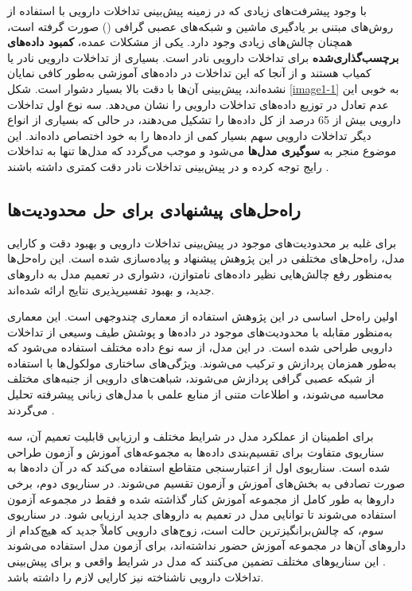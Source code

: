 با وجود پیشرفت‌های زیادی که در زمینه پیش‌بینی تداخلات دارویی با استفاده از روش‌های مبتنی بر یادگیری ماشین و شبکه‌های عصبی گرافی () صورت گرفته است، همچنان چالش‌های زیادی وجود دارد. یکی از مشکلات عمده، \textbf{کمبود داده‌های برچسب‌گذاری‌شده} برای تداخلات دارویی نادر است. بسیاری از تداخلات دارویی نادر یا کمیاب هستند و از آنجا که این تداخلات در داده‌های آموزشی به‌طور کافی نمایان نشده‌اند، پیش‌بینی آن‌ها با دقت بالا بسیار دشوار است. شکل \ref{image1-1} به خوبی این عدم تعادل در توزیع داده‌های تداخلات دارویی را نشان می‌دهد. سه نوع اول تداخلات دارویی بیش از 65 درصد از کل داده‌ها را تشکیل می‌دهند، در حالی که بسیاری از انواع دیگر تداخلات دارویی سهم بسیار کمی از داده‌ها را به خود اختصاص داده‌اند. این موضوع منجر به \textbf{سوگیری مدل‌ها} می‌شود و موجب می‌گردد که مدل‌ها تنها به تداخلات رایج توجه کرده و در پیش‌بینی تداخلات نادر دقت کمتری داشته باشند \cite{ref_wang2017}.

\subsection{راه‌حل‌های پیشنهادی برای حل محدودیت‌ها}

برای غلبه بر محدودیت‌های موجود در پیش‌بینی تداخلات دارویی و بهبود دقت و کارایی مدل، راه‌حل‌های مختلفی در این پژوهش پیشنهاد و پیاده‌سازی شده است. این راه‌حل‌ها به‌منظور رفع چالش‌هایی نظیر داده‌های نامتوازن، دشواری در تعمیم مدل به داروهای جدید، و بهبود تفسیرپذیری نتایج ارائه شده‌اند.

اولین راه‌حل اساسی در این پژوهش استفاده از معماری چندوجهی است. این معماری به‌منظور مقابله با محدودیت‌های موجود در داده‌ها و پوشش طیف وسیعی از تداخلات دارویی طراحی شده است. در این مدل، از سه نوع داده مختلف استفاده می‌شود که به‌طور همزمان پردازش و ترکیب می‌شوند. ویژگی‌های ساختاری مولکول‌ها با استفاده از شبکه عصبی گرافی پردازش می‌شوند، شباهت‌های دارویی از جنبه‌های مختلف محاسبه می‌شوند، و اطلاعات متنی از منابع علمی با مدل‌های زبانی پیشرفته تحلیل می‌گردند \cite{ref_dai2020}.

برای اطمینان از عملکرد مدل در شرایط مختلف و ارزیابی قابلیت تعمیم آن، سه سناریوی متفاوت برای تقسیم‌بندی داده‌ها به مجموعه‌های آموزش و آزمون طراحی شده است. سناریوی اول از اعتبارسنجی متقاطع استفاده می‌کند که در آن داده‌ها به صورت تصادفی به بخش‌های آموزش و آزمون تقسیم می‌شوند. در سناریوی دوم، برخی داروها به طور کامل از مجموعه آموزش کنار گذاشته شده و فقط در مجموعه آزمون استفاده می‌شوند تا توانایی مدل در تعمیم به داروهای جدید ارزیابی شود. در سناریوی سوم، که چالش‌برانگیزترین حالت است، زوج‌های دارویی کاملاً جدید که هیچ‌کدام از داروهای آن‌ها در مجموعه آموزش حضور نداشته‌اند، برای آزمون مدل استفاده می‌شوند \cite{ref_deng2020}. این سناریوهای مختلف تضمین می‌کنند که مدل در شرایط واقعی و برای پیش‌بینی تداخلات دارویی ناشناخته نیز کارایی لازم را داشته باشد.

